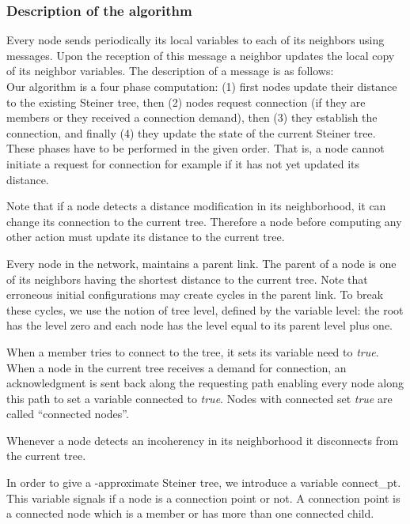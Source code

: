 \documentclass[11pt]{article}
\newcommand{\level}{\mbox{\sf level}}
\newcommand{\need}{\mbox{\sf need}}
\newcommand{\connect}{\mbox{\sf connected}}
\newcommand{\connectpt}{\mbox{\sf connect\_pt}}
\begin{document}
\subsubsection{Description of the algorithm}
\label{sec:algo}
Every node  sends periodically its local variables to each of its neighbors
using  messages. Upon the reception of this message a neighbor updates the local copy
of its neighbor variables. The description of a  message is
as follows:\\ 


Our algorithm is a four phase computation: (1)
first nodes update their distance to the existing Steiner tree, then (2) nodes
request connection (if they are members or they received a connection
demand), then (3) they establish the
connection, and finally (4) they update the state of the current Steiner tree.  These
phases have to be performed in the given order.
That is, a node cannot initiate a request for connection for example if it has not yet updated
its distance.



Note that if a node detects a
distance modification in its neighborhood, it can change its
connection to the current tree. Therefore a node  before computing any
other action must update its
distance to the current tree. 

Every node in the network, 
maintains a
parent link. The parent of a node is one of its neighbors having the shortest
distance to the current tree. Note that erroneous initial configurations may create cycles in the
parent link. To break these cycles, we 
use the notion of tree level, defined by the variable \level: 
the root has the level zero and each node has the level equal to its parent level plus one.


When a member tries to connect to the
tree, it sets its variable
\need\/ to \emph{true}. 
When a node in the current tree receives a
demand for connection, an acknowledgment is sent back along the
requesting path enabling every node along this path to set a variable \connect\/ to
\emph{true}. Nodes with \connect\/ set \emph{true} are called
``connected nodes''. 

Whenever a node detects an incoherency in its neighborhood it disconnects
from the current tree. 



In order to give a -approximate Steiner tree, we introduce a variable \connectpt. This variable
signals if a node is a connection point or not. A connection
point is a connected node which is a member or has more than one
connected child. 
\end{document}
